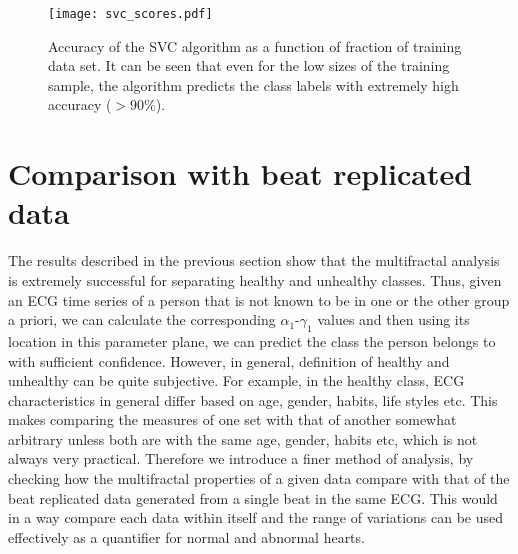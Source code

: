 \documentclass[9pt,twocolumn,twoside]{pnas-new}
\begin{document}
\begin{figure}[h]
\begin{center}
\texttt{[image: svc\_scores.pdf]}
\caption{\label{svc_scores}  Accuracy of the SVC algorithm as a function of fraction of training data set. It can be seen that even for the low sizes of the training sample, the algorithm predicts the class labels with extremely high accuracy ($>90\%$).}
\end{center}
\end{figure}




\section{Comparison with beat replicated data}
The results described in the previous section show that the multifractal analysis is extremely successful for separating healthy and unhealthy classes. Thus, given an ECG time series of a person that is not known to be in one or the other group a priori, we can calculate the corresponding $\alpha_1$-$\gamma_1$ values and then using its location in this parameter plane, we can predict the class the person belongs to with sufficient confidence. However, in general, definition of healthy and unhealthy can be quite subjective. For example, in the healthy class, ECG characteristics in general differ based on age, gender, habits, life styles etc. This makes comparing the measures of one set with that of another somewhat arbitrary unless both are with the same age, gender, habits etc, which is not always very practical. Therefore we introduce a finer method of analysis, by checking how the multifractal properties of a given data compare with that of the beat replicated data generated from a single beat in the same ECG. This would in a way compare each data within itself and the range of variations can be used effectively as a quantifier for normal and abnormal hearts.
\end{document}
